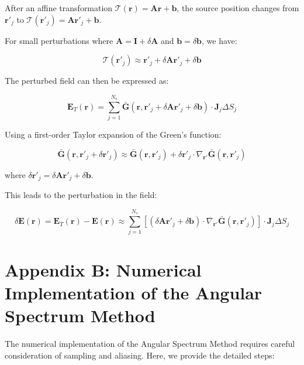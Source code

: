 \documentclass[12pt,a4paper]{article}
\begin{document}
After an affine transformation $\mathcal{T}(\mathbf{r}) = \mathbf{A}\mathbf{r} + \mathbf{b}$, the source position changes from $\mathbf{r}'_j$ to $\mathcal{T}(\mathbf{r}'_j) = \mathbf{A}\mathbf{r}'_j + \mathbf{b}$.

For small perturbations where $\mathbf{A} = \mathbf{I} + \delta\mathbf{A}$ and $\mathbf{b} = \delta\mathbf{b}$, we have:

\begin{equation}
    \mathcal{T}(\mathbf{r}'_j) \approx \mathbf{r}'_j + \delta\mathbf{A}\mathbf{r}'_j + \delta\mathbf{b}
\end{equation}

The perturbed field can then be expressed as:

\begin{equation}
    \mathbf{E}_T(\mathbf{r}) = \sum_{j=1}^{N_s} \bar{\mathbf{G}}(\mathbf{r}, \mathbf{r}'_j + \delta\mathbf{A}\mathbf{r}'_j + \delta\mathbf{b}) \cdot \mathbf{J}_j \Delta S_j
\end{equation}

Using a first-order Taylor expansion of the Green's function:

\begin{equation}
    \bar{\mathbf{G}}(\mathbf{r}, \mathbf{r}'_j + \delta\mathbf{r}'_j) \approx \bar{\mathbf{G}}(\mathbf{r}, \mathbf{r}'_j) + \delta\mathbf{r}'_j \cdot \nabla_{\mathbf{r}'} \bar{\mathbf{G}}(\mathbf{r}, \mathbf{r}'_j)
\end{equation}

where $\delta\mathbf{r}'_j = \delta\mathbf{A}\mathbf{r}'_j + \delta\mathbf{b}$.

This leads to the perturbation in the field:

\begin{equation}
    \delta\mathbf{E}(\mathbf{r}) = \mathbf{E}_T(\mathbf{r}) - \mathbf{E}(\mathbf{r}) \approx \sum_{j=1}^{N_s} \left[ (\delta\mathbf{A}\mathbf{r}'_j + \delta\mathbf{b}) \cdot \nabla_{\mathbf{r}'} \bar{\mathbf{G}}(\mathbf{r}, \mathbf{r}'_j) \right] \cdot \mathbf{J}_j \Delta S_j
\end{equation}

\section{Appendix B: Numerical Implementation of the Angular Spectrum Method}

The numerical implementation of the Angular Spectrum Method requires careful consideration of sampling and aliasing. Here, we provide the detailed steps:
\end{document}
